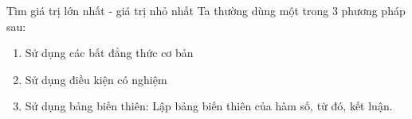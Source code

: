\begin{dang}{Tìm giá trị lớn nhất - giá trị nhỏ nhất}
	Ta thường dùng một trong 3 phương pháp sau:
	\begin{enumerate}[\faCheckSquareO]
		\item Sử dụng các bất đẳng thức cơ bản
		\item Sử dụng điều kiện có nghiệm
		\item Sử dụng bảng biến thiên: Lập bảng biến thiên của hàm số, từ đó, kết luận.
	\end{enumerate}
\end{dang}

